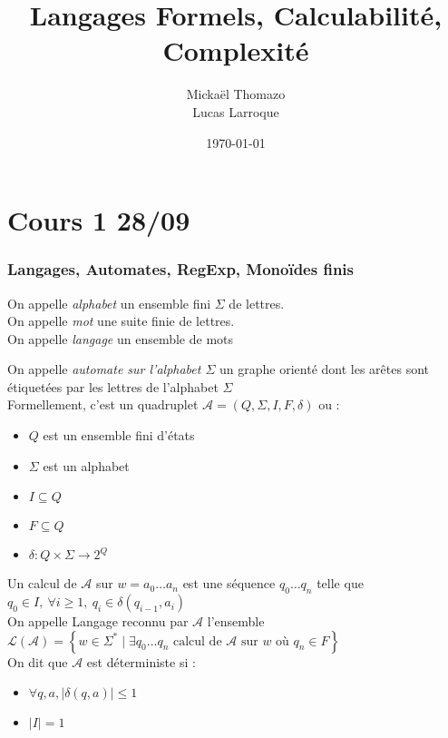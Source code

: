 \documentclass{cours}
\title{Langages Formels, Calculabilité, Complexité}
\author{Mickaël Thomazo \\ \small{Lucas Larroque}}
\date{\today}
\begin{document}
\part{Cours 1 28/09}
\section{Langages, Automates, RegExp, Monoïdes finis}
\begin{definition}
    On appelle \emph{alphabet} un ensemble fini $\Sigma$ de lettres. \\
    On appelle \emph{mot} une suite finie de lettres. \\
    On appelle \emph{langage} un ensemble de mots
\end{definition}
\begin{definition}
    On appelle \emph{automate sur l'alphabet $\Sigma$} un graphe orienté dont les arêtes sont étiquetées par les lettres de l'alphabet $\Sigma$\\
    Formellement, c'est un quadruplet $\mathcal{A} = (Q, \Sigma, I, F, \delta)$ ou : \begin{itemize}
        \item $Q$ est un ensemble fini d'états
        \item $\Sigma$ est un alphabet
        \item $I \subseteq Q$
        \item $F \subseteq Q$
        \item $\delta : Q \times \Sigma \rightarrow 2^{Q}$
    \end{itemize}

    Un calcul de $\mathcal{A}$ sur $w = a_{0}\ldots a_{n}$ est une séquence $q_{0}\ldots q_{n}$ telle que $q_{0} \in I, \ \forall i \geq 1,\ q_{i} \in \delta(q_{i-1}, a_{i})$\\
    On appelle Langage reconnu par $\mathcal{A}$ l'ensemble $\mathcal{L}(\mathcal{A}) =  \left\{w \in \Sigma^{*} \mid \exists q_{0}\ldots q_{n} \text{ calcul de } \mathcal{A} \text{ sur } w \text{ où } q_{n} \in F\right\}$\\
    On dit que $\mathcal{A}$ est déterministe si :\begin{itemize}
        \item $\forall q, a, \left| \delta(q, a)\right| \leq 1$
        \item $\left| I\right| = 1$
    \end{itemize} 
\end{definition}
\end{document}
